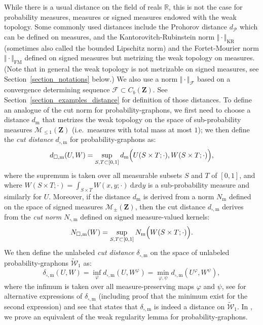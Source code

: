 \documentclass{amsart}
\newcommand{\ie}{i.e.\ }
\theoremstyle{plain}
\theoremstyle{definition}
\newcommand{\Space}{\mathbf{Z}}
\newcommand{\SubProba}{\mathcal{M}_{\leq1}(\Space)}
\newcommand{\SignedMeas}{\mathcal{M}_{\pm}(\Space)}
\newcommand{\CbFunct}{C_b(\Space)}
\newcommand{\UGraphon}{\widetilde{\mathcal{W}}_1}
\newcommand{\m}{\mathrm{m}}
\newcommand{\dmeas}{d_\m}
\newcommand{\NmeasLLarge}[1]{N_\m\Bigl(#1\Bigr)}
\newcommand{\NmeasSymbol}{N_\m}
\newcommand{\dcut}{d_{\square,\m}}
\newcommand{\Ncut}[1]{N_{\square,\m}(#1)}
\newcommand{\NcutSymbol}{N_{\square,\m}}
\newcommand{\ddcut}{\delta_{\square,\m}}
\newcommand{\NmeasFSymbol}{\Vert\cdot\Vert_{\mathcal{F}}}
\newcommand{\F}{\mathcal{F}}
\newcommand{\dmeasP}{d_{\mathcal{P}}}
\newcommand{\mKR}{\text{KR}}
\newcommand{\NmeasKRSymbol}{\Vert\cdot\Vert_{\mKR}}
\newcommand{\mFM}{\text{FM}}
\newcommand{\NmeasFMSymbol}{\Vert\cdot\Vert_{\mFM}}
\newcommand{\R}{\mathbb{R}}
\newcommand{\drv}{\mathrm{d}}
\begin{document}
While there is a usual distance on the field of reals $\R$, this is not the case for probability measures,
	 measures or signed measures endowed with the weak topology.
Some commonly used distances include the Prohorov distance $\dmeasP$ which can be defined on measures,
	and the Kantorovitch-Rubinstein norm $\NmeasKRSymbol$ (sometimes also called the bounded Lipschitz norm)
		and the Fortet-Mourier norm $\NmeasFMSymbol$ defined on signed measures 
		but metrizing the weak topology on measures.
	(Note that in general the weak topology is not metrizable on signed measures,
		see Section~\ref{section_notations} below.)
We also use a norm $\NmeasFSymbol$ based on a convergence determining sequence $\F \subset \CbFunct$.
	See Section~\ref{section_examples_distance} for definition of those distances.
To define an analogue of the cut norm for probability-graphons,
	we first need to choose a distance $\dmeas$ that metrizes the weak topology 
		on the space of sub-probability measures $\SubProba$
		(\ie measures with total mass at most $1$);
	we then define the \emph{cut distance} $\dcut$ for probability-graphons as:
\begin{equation*}
\dcut(U,W) = \sup_{S,T\subset [0,1]} 
\dmeas \Bigl(U(S\times T;\cdot), W(S\times T;\cdot) \Bigr)  ,
\end{equation*}
where the supremum is taken over all  measurable subsets $S$ and $T$ of $[0,1]$,
and where $W(S\times T;\cdot) = \int_{S\times T} W(x,y;\cdot)\ \drv x \drv y$ is a sub-probability measure
	and similarly for $U$.
Moreover, if the distance $\dmeas$ is derived from a norm $\NmeasSymbol$ defined on the space of signed measures $\SignedMeas$,
	then the cut distance $\dcut$ derives from the \emph{cut norm} $\NcutSymbol$ defined
		on signed measure-valued kernels: 
\begin{equation*}
\Ncut{W} = \sup_{S,T\subset [0,1]} 
\NmeasLLarge{W(S\times T;\cdot)}   .
\end{equation*}
We then define the unlabeled \emph{cut distance} $\ddcut$ on the space of unlabeled probability-graphons $\UGraphon$ as:
\begin{equation*}
\ddcut(U,W) = \inf_{\varphi} \dcut(U, W^\varphi) = \min_{\varphi, \psi} \dcut(U^\varphi, W^\psi) ,
\end{equation*}
where the infimum is taken over all measure-preserving maps $\varphi$ and $\psi$,
	see  for alternative expressions of $\ddcut$ (including proof that the minimum exist for the second expression)
	and see  that states that $\ddcut$ is indeed a distance on $\UGraphon$.
In , we prove an equivalent of the weak regularity lemma
	for probability-graphons. 
\end{document}
